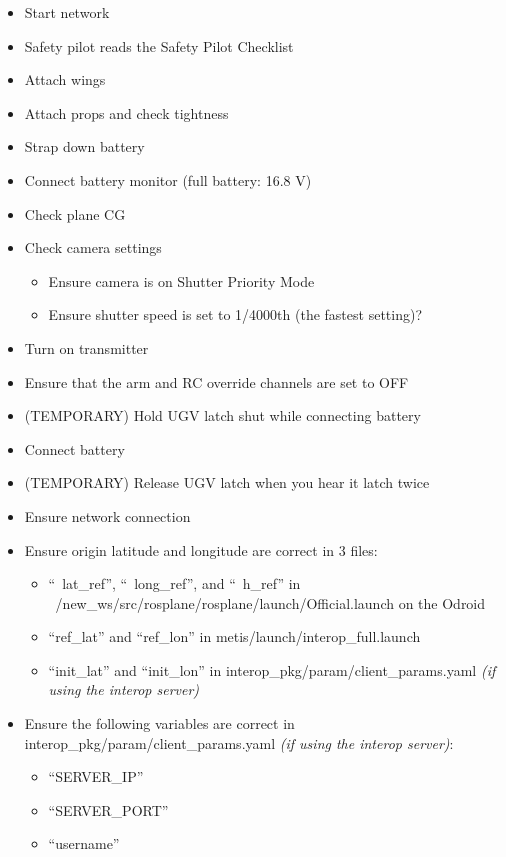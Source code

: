 \documentclass[]{auvsi_doc}
\begin{document}
\begin{itemize}
	\item Start network
	\item Safety pilot reads the Safety Pilot Checklist
	\item Attach wings%
	\item Attach props and check tightness
	\item Strap down battery
	\item Connect battery monitor (full battery: 16.8 V)
	\item Check plane CG
        \item Check camera settings
        \begin{itemize}
          \item Ensure camera is on Shutter Priority Mode
          \item Ensure shutter speed is set to 1/4000th (the fastest setting)?
        \end{itemize}
	\item Turn on transmitter
	\item Ensure that the arm and RC override channels are set to OFF
	\item (TEMPORARY) Hold UGV latch shut while connecting battery
	\item Connect battery
	\item (TEMPORARY) Release UGV latch when you hear it latch twice
	\item Ensure network connection
	\item Ensure origin latitude and longitude are correct in 3 files:
	\begin{itemize}
		\item ``~lat_ref'', ``~long_ref'', and ``~h_ref'' in ~/new_ws/src/rosplane/rosplane/launch/Official.launch on the Odroid
		\item ``ref_lat'' and ``ref_lon'' in metis/launch/interop_full.launch
		\item ``init_lat'' and ``init_lon'' in interop_pkg/param/client_params.yaml \textit{(if using the interop server)}
	\end{itemize}
	\item Ensure the following variables are correct in interop_pkg/param/client_params.yaml \textit{(if using the interop server)}:
	\begin{itemize}
		\item ``SERVER_IP''
		\item ``SERVER_PORT''
		\item ``username''

\end{itemize}
\end{itemize}
\end{document}
